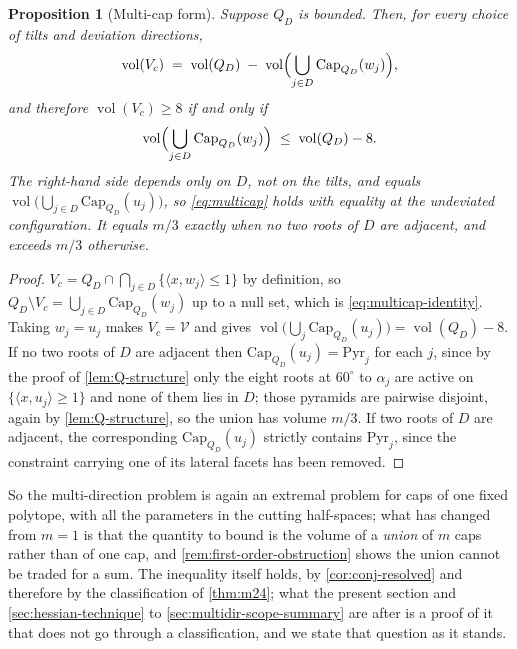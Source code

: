 \documentclass[11pt,reqno]{amsart}
\renewcommand{\_}{\origunderscore\allowbreak}
\numberwithin{equation}{section}
\theoremstyle{plain}
\newtheorem{prop}[thm]{Proposition}
\theoremstyle{definition}
\theoremstyle{remark}
\newcommand{\VCell}{\mathcal{V}}             %
\newcommand{\base}{u}                        %
\newcommand{\capQ}{\mathrm{Cap}}             %
\DeclareMathOperator{\vol}{vol}
\begin{document}
\begin{prop}[Multi-cap form]\label{prop:multi-cap}
Suppose $Q_D$ is bounded. Then, for every choice of tilts and deviation
directions,
\begin{equation}\label{eq:multicap-identity}
  \vol(V_c)\;=\;\vol(Q_D)\;-\;\vol\Bigl(\bigcup_{j\in D}\capQ_{Q_D}(w_j)\Bigr),
\end{equation}
and therefore $\vol(V_c)\ge8$ if and only if
\begin{equation}\label{eq:multicap}
  \vol\Bigl(\bigcup_{j\in D}\capQ_{Q_D}(w_j)\Bigr)\;\le\;\vol(Q_D)-8 .
\end{equation}
The right-hand side depends only on $D$, not on the tilts, and equals
$\vol\bigl(\bigcup_{j\in D}\capQ_{Q_D}(\base_j)\bigr)$, so
\eqref{eq:multicap} holds with equality at the undeviated configuration.
It equals $m/3$ exactly when no two roots of $D$ are adjacent, and
exceeds $m/3$ otherwise.
\end{prop}

\begin{proof}
$V_c=Q_D\cap\bigcap_{j\in D}\{\langle x,w_j\rangle\le1\}$ by definition,
so $Q_D\setminus V_c=\bigcup_{j\in D}\capQ_{Q_D}(w_j)$ up to a null set,
which is \eqref{eq:multicap-identity}. Taking $w_j=\base_j$ makes
$V_c=\VCell$ and gives
$\vol\bigl(\bigcup_j\capQ_{Q_D}(\base_j)\bigr)=\vol(Q_D)-8$. If no two
roots of $D$ are adjacent then $\capQ_{Q_D}(\base_j)=\mathrm{Pyr}_j$ for
each $j$, since by the proof of \cref{lem:Q-structure} only the eight
roots at $60^\circ$ to $\alpha_j$ are active on $\{\langle
x,\base_j\rangle\ge1\}$ and none of them lies in $D$; those pyramids are
pairwise disjoint, again by \cref{lem:Q-structure}, so the union has
volume $m/3$. If two roots of $D$ are adjacent, the corresponding
$\capQ_{Q_D}(\base_j)$ strictly contains $\mathrm{Pyr}_j$, since the
constraint carrying one of its lateral facets has been removed.
\end{proof}

So the multi-direction problem is again an extremal problem for caps of
one fixed polytope, with all the parameters in the cutting half-spaces;
what has changed from $m=1$ is that the quantity to bound is the volume
of a \emph{union} of $m$ caps rather than of one cap, and
\cref{rem:first-order-obstruction} shows the union cannot be traded for
a sum. The inequality itself holds, by \cref{cor:conj-resolved} and
therefore by the classification of \cref{thm:m24}; what the present
section and \cref{sec:hessian-technique} to \cref{sec:multidir-scope-summary}
are after is a proof of it that does not go through a classification,
and we state that question as it stands.
\end{document}
